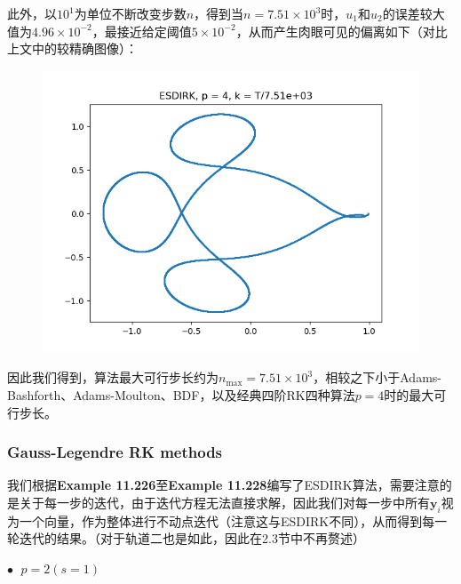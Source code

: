 \documentclass{ctexart}
\begin{document}
\begin{sloppypar}
此外，以$10^1$为单位不断改变步数$n$，得到当$n = 7.51 \times 10^3$时，$u_1$和$u_2$的误差较大值为$4.96 \times 10^{-2}$，最接近给定阈值$5 \times 10^{-2}$，从而产生肉眼可见的偏离如下（对比上文中的较精确图像）：
\begin{figure}[H]
\centering
\includegraphics[scale = 0.45]{./report_src/Figure_28.png}
\end{figure}
因此我们得到，算法最大可行步长约为$n_{\max} = 7.51 \times 10^3$，相较之下小于Adams-Bashforth、Adams-Moulton、BDF，以及经典四阶RK四种算法$p=4$时的最大可行步长。

\subsubsection{Gauss-Legendre RK methods}
我们根据\textbf{Example 11.226}至\textbf{Example 11.228}编写了ESDIRK算法，需要注意的是关于每一步的迭代，由于迭代方程无法直接求解，因此我们对每一步中所有$\mathbf{y}_i$视为一个向量，作为整体进行不动点迭代（注意这与ESDIRK不同），从而得到每一轮迭代的结果。（对于轨道二也是如此，因此在2.3节中不再赘述）

$\bullet \;$ $p = 2(s=1)$


\end{sloppypar}
\end{document}
